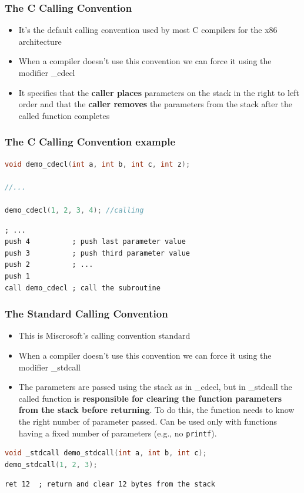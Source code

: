 \documentclass[]{beamer}
\begin{document}
\begin{frame}
  \frametitle{The C Calling Convention}
  \begin{itemize}
  \item{It's the default calling convention used by most C compilers for the x86 architecture}
  \item{When a compiler doesn't use this convention we can force it using the modifier \color{red}\_cdecl}
  \item{It specifies that the \textbf{caller places} parameters on the stack in the right to left order and that the \textbf{caller removes} the parameters from the stack after the called function completes}
  \end{itemize}
\end{frame}
\begin{frame}[fragile]
  \frametitle{The C Calling Convention example}
\begin{lstlisting}[language=C]
void demo_cdecl(int a, int b, int c, int z);

//...

demo_cdecl(1, 2, 3, 4); //calling
\end{lstlisting}

\begin{lstlisting}[language={[x86masm]Assembler}]
; ...
push 4          ; push last parameter value
push 3          ; push third parameter value
push 2          ; ...
push 1
call demo_cdecl ; call the subroutine
\end{lstlisting}

\end{frame}

\begin{frame}[fragile]
  \frametitle{The Standard Calling Convention}
  \begin{itemize}
  \item{This is Miscrosoft's calling convention standard}
  \item{When a compiler doesn't use this convention we can force it using the modifier \color{red}\_stdcall}
  \item{The parameters are passed using the stack as in \_cdecl, but in \_stdcall the called function is \textbf{responsible for clearing the function parameters from the stack before returning}. To do this, the function needs to know the right number of parameter passed. Can be used only with functions having a fixed number of parameters (e.g., no \texttt{printf}).}
  \end{itemize}

\begin{lstlisting}[language=C]
void _stdcall demo_stdcall(int a, int b, int c);
demo_stdcall(1, 2, 3);
\end{lstlisting}
\begin{lstlisting}[language={[x86masm]Assembler}]
ret 12  ; return and clear 12 bytes from the stack
\end{lstlisting}
\end{frame}
\end{document}
